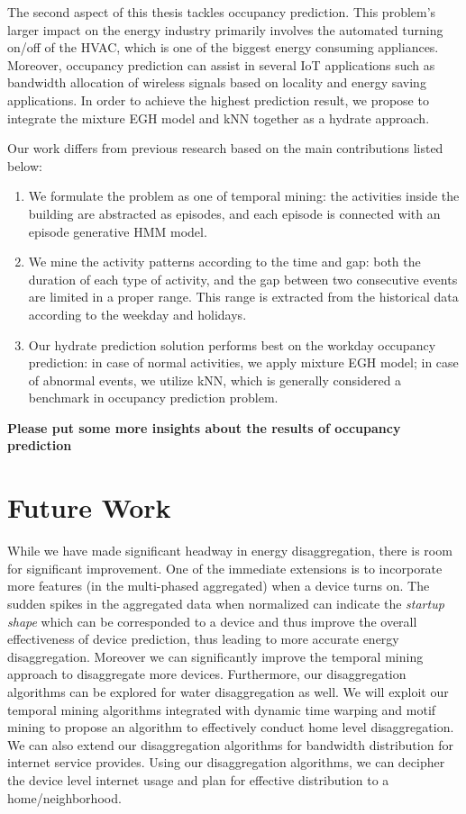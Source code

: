 The second aspect of this thesis tackles occupancy prediction. This problem's larger impact on the energy industry primarily involves the automated turning on/off of the HVAC, which is one of the biggest energy consuming appliances. Moreover, occupancy prediction can assist in several IoT applications such as bandwidth allocation of wireless signals based on locality and energy saving applications.
In order to achieve the highest prediction result, 
we propose to integrate the mixture EGH model and 
kNN together as a hydrate approach.

Our work differs from previous research based on the main contributions listed below:
\begin{enumerate}
\item We formulate the problem as one of temporal mining: the activities inside the building are abstracted as episodes, and each episode is connected with an episode generative HMM model.
\item We mine the activity patterns according to the time and gap: both the duration of each type of 
activity, and the gap between two consecutive events are limited in a proper range. 
This range is extracted from the historical data according to the weekday and holidays.
\item Our hydrate prediction solution performs best on the workday occupancy prediction: 
in case of normal activities, we apply mixture EGH model; 
in case of abnormal events, we utilize kNN,  
which is generally considered a benchmark in occupancy prediction problem. 
\end{enumerate}

\textbf{Please put some more insights about the results of occupancy prediction}

\section{Future Work}
While we have made significant headway in energy disaggregation, there is room for significant improvement. One of the immediate extensions is to incorporate more features (in the multi-phased aggregated) when a device turns on. The sudden spikes in the aggregated data when normalized can indicate the \emph{startup shape} which can be corresponded to a device and thus improve the overall effectiveness of device prediction, thus leading to more accurate energy disaggregation. Moreover we can significantly improve the temporal mining approach to disaggregate more devices. Furthermore, our disaggregation algorithms can be explored for water disaggregation as well. We will exploit our temporal mining algorithms integrated with dynamic time warping and motif mining to propose an algorithm to effectively conduct home level disaggregation. We can also extend our disaggregation algorithms for bandwidth distribution for internet service provides. Using our disaggregation algorithms, we can decipher the device level internet usage and plan for effective distribution to a home/neighborhood. 

